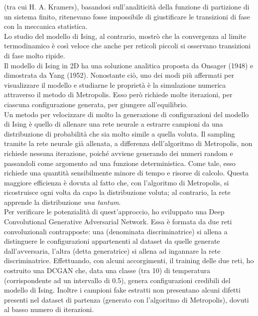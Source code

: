 \documentclass[a4paper]{article}
\begin{document}
(tra cui H. A. Kramers), basandosi sull'analiticità della funzione di partizione di un sistema finito, ritenevano fosse impossibile di giustificare le transizioni di fase con la meccanica statistica. \cite{Kadanoff2009} \\
Lo studio del modello di Ising, al contrario, mostrò che la convergenza al limite termodinamico è così veloce che anche per reticoli piccoli si osservano transizioni di fase molto ripide.\\
Il modello di Ising in 2D ha una soluzione analitica proposta da Onsager (1948) e dimostrata da Yang (1952). Nonostante ciò, uno dei modi più affermati per visualizzare il modello e studiarne le proprietà è la simulazione numerica attraverso il metodo di Metropolis. Esso però richiede molte iterazioni, per ciascuna configurazione generata, per giungere all'equilibrio. \\
Un metodo per velocizzare di molto la generazione di configurazioni del modello di Ising è quello di allenare una rete neurale a estrarre campioni da una distribuzione di probabilità che sia molto simile a quella voluta. Il sampling tramite la rete neurale già allenata, a differenza dell'algoritmo di Metropolis, non richiede nessuna iterazione, poiché avviene generando dei numeri random e passandoli come argomento ad una funzione deterministica. Come tale, esso richiede una quantità sensibilmente minore di tempo e risorse di calcolo. Questa maggiore efficienza è dovuta al fatto che, con l'algoritmo di Metropolis, si ricostruisce ogni volta da capo la distribuzione voluta; al contrario, la rete apprende la distribuzione \textit{una tantum}. \\
Per verificare le potenzialità di quest'approccio, ho sviluppato una  Deep Convolutional Generative Adversarial Network. Essa è formata da due reti convoluzionali contrapposte: una (denominata discriminatrice) si allena a distinguere le configurazioni appartenenti al dataset da quelle generate dall'avversaria, l'altra (detta generatrice) si allena ad ingannare la rete discriminatrice. Effettuando, con alcuni accorgimenti, il training delle due reti, ho costruito una DCGAN che, data una classe (tra 10) di temperatura (corrispondente ad un intervallo di 0.5), genera configurazioni credibili del modello di Ising. Inoltre i campioni fake estratti non presentano alcuni difetti presenti nel dataset di partenza (generato con l'algoritmo di Metropolis), dovuti al basso numero di iterazioni.
\end{document}
